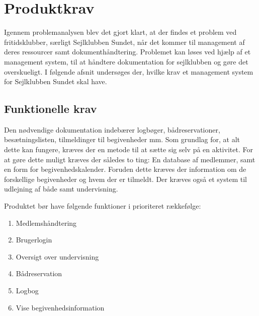\chapter{Produktkrav}

Igennem problemanalysen blev det gjort klart, at der findes et problem ved fritidsklubber, særligt Sejlklubben Sundet, når det kommer til management af deres ressourcer samt dokumenthåndtering. 
Problemet kan løses ved hjælp af et management system, til at håndtere dokumentation for sejlklubben og gøre det overskueligt. 
I følgende afsnit undersøges der, hvilke krav et management system for Sejlklubben Sundet skal have. 


\section{Funktionelle krav} \label{sec:funktionelleKrav}

Den nødvendige dokumentation indebærer logbøger, bådreservationer, besætningslisten, tilmeldinger til begivenheder mm. 
Som grundlag for, at alt dette kan fungere, kræves der en metode til at sætte sig selv på en aktivitet. 
For at gøre dette muligt kræves der således to ting: En database af medlemmer, samt en form for begivenhedskalender.
Foruden dette kræves der information om de forskellige begivenheder og hvem der er tilmeldt. 
Der kræves også et system til udlejning af både samt undervisning.

Produktet bør have følgende funktioner i prioriteret rækkefølge:
\begin{enumerate}
  \item Medlemshåndtering
  \item Brugerlogin
  \item Oversigt over undervisning 
  \item Bådreservation
  \item Logbog
  \item Vise begivenhedsinformation 
\end{enumerate}


